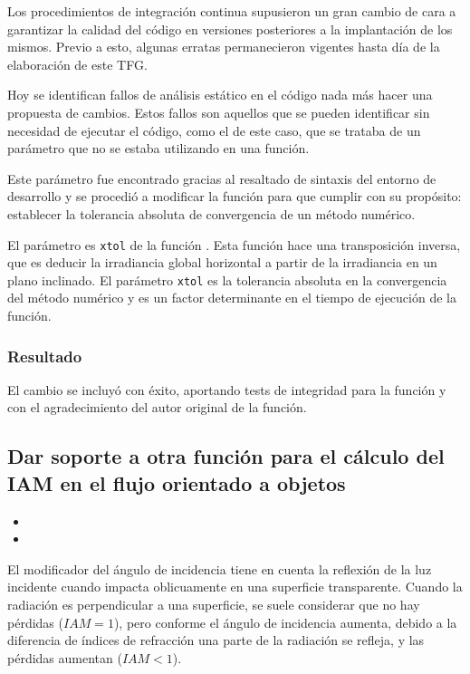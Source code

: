 Los procedimientos de integración continua supusieron un gran cambio de cara a garantizar la calidad del código en versiones posteriores a la implantación de los mismos. Previo a esto, algunas erratas permanecieron vigentes hasta día de la elaboración de este TFG.

Hoy se identifican fallos de análisis estático en el código nada más hacer una propuesta de cambios. Estos fallos son aquellos que se pueden identificar sin necesidad de ejecutar el código, como el de este caso, que se trataba de un parámetro que no se estaba utilizando en una función.

Este parámetro fue encontrado gracias al resaltado de sintaxis del entorno de desarrollo y se procedió a modificar la función para que cumplir con su propósito: establecer la tolerancia absoluta de convergencia de un método numérico.

El parámetro es \texttt{xtol} de la función . Esta función hace una transposición inversa, que es deducir la irradiancia global horizontal a partir de la irradiancia en un plano inclinado. El parámetro \texttt{xtol} es la tolerancia absoluta en la convergencia del método numérico y es un factor determinante en el tiempo de ejecución de la función.

\subsubsection{Resultado}

El cambio se incluyó con éxito, aportando tests de integridad para la función y con el agradecimiento del autor original de la función.

\subsection{Dar soporte a otra función para el cálculo del IAM en el flujo orientado a objetos}

\begin{itemize}
    \item {}
    \item {}
\end{itemize}

El modificador del ángulo de incidencia tiene en cuenta la reflexión de la luz incidente cuando impacta oblicuamente en una superficie transparente. Cuando la radiación es perpendicular a una superficie, se suele considerar que no hay pérdidas ($IAM = 1$), pero conforme el ángulo de incidencia aumenta, debido a la diferencia de índices de refracción una parte de la radiación se refleja, y las pérdidas aumentan ($IAM < 1$).

